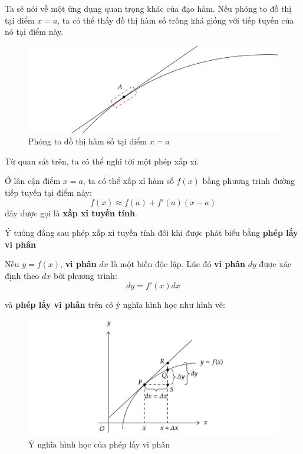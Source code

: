 Ta sẽ nói về một ứng dụng quan trọng khác của đạo hàm. Nếu phóng to đồ thị tại điểm $x=a$, ta có thể thấy đồ thị hàm số trông khá giống với tiếp tuyến của nó tại điểm này.
\begin{figure}[H]
\centering
\includegraphics[width=1\textwidth]{Tuan1/Figures/xapxituyentinh.png}
\caption{Phóng to đồ thị hàm số tại điểm $x=a$}
\end{figure}
Từ quan sát trên, ta có thể nghĩ tới một phép xấp xỉ.

\begin{definition}
    Ở lân cận điểm $x=a$, ta có thể xấp xỉ hàm số $f(x)$ bằng phương trình đường tiếp tuyến tại điểm này:
\begin{equation}
        f(x)\approx f(a)+f'(a)(x-a)
    \end{equation}
đây được gọi là \textbf{xấp xỉ tuyến tính}.
\end{definition}
Ý tưởng đằng sau phép xấp xỉ tuyến tính đôi khi được phát biểu bằng \textbf{phép lấy vi phân}

\begin{definition}
    Nếu $y=f(x)$, \textbf{vi phân} $dx$ là một biến độc lập. Lúc đó \textbf{vi phân} $dy$ được xác định theo $dx$ bởi phương trình:
\begin{equation}
    dy=f'(x)dx
\end{equation}
\end{definition}
và \textbf{phép lấy vi phân} trên có ý nghĩa hình học như hình vẽ:

\begin{figure}[H]
\centering
\includegraphics[width=1\textwidth]{Tuan1/Figures/viphan.png}
\caption{Ý nghĩa hình học của phép lấy vi phân}
\end{figure}